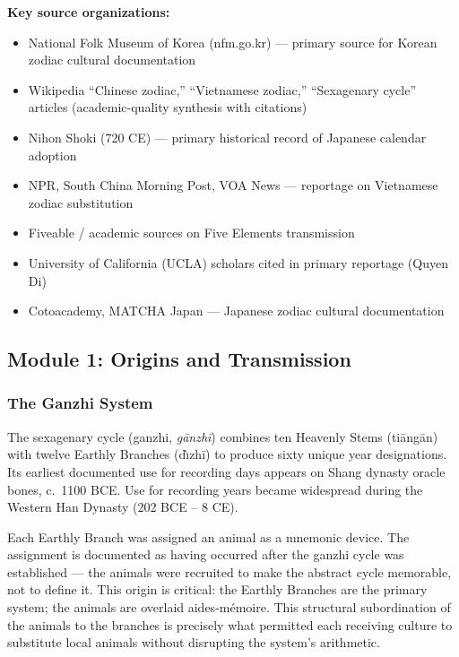 \documentclass[11pt,letterpaper]{article}
\begin{document}
\textbf{Key source organizations:}
\begin{itemize}[leftmargin=2em]
  \item National Folk Museum of Korea (nfm.go.kr) --- primary source for Korean zodiac cultural documentation
  \item Wikipedia ``Chinese zodiac,'' ``Vietnamese zodiac,'' ``Sexagenary cycle'' articles (academic-quality synthesis with citations)
  \item Nihon Shoki (720 CE) --- primary historical record of Japanese calendar adoption
  \item NPR, South China Morning Post, VOA News --- reportage on Vietnamese zodiac substitution
  \item Fiveable / academic sources on Five Elements transmission
  \item University of California (UCLA) scholars cited in primary reportage (Quyen Di)
  \item Cotoacademy, MATCHA Japan --- Japanese zodiac cultural documentation
\end{itemize}

\subsection{Module 1: Origins and Transmission}

\subsubsection{The Ganzhi System}

The sexagenary cycle (ganzhi, \textit{g\={a}nzh\=i}) combines ten Heavenly Stems (ti\={a}ng\={a}n) with twelve Earthly Branches (d\`\i zh\=i) to produce sixty unique year designations. Its earliest documented use for recording days appears on Shang dynasty oracle bones, c.\ 1100 BCE. Use for recording years became widespread during the Western Han Dynasty (202 BCE -- 8 CE).

Each Earthly Branch was assigned an animal as a mnemonic device. The assignment is documented as having occurred after the ganzhi cycle was established --- the animals were recruited to make the abstract cycle memorable, not to define it. This origin is critical: the Earthly Branches are the primary system; the animals are overlaid aides-m\'emoire. This structural subordination of the animals to the branches is precisely what permitted each receiving culture to substitute local animals without disrupting the system's arithmetic.
\end{document}
